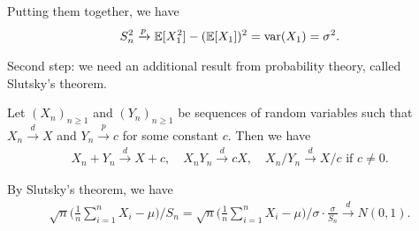 \documentclass[11pt,letterpaper]{article}
\begin{document}
Putting them together, we have
\begin{align*}
  S_n^2 \xrightarrow{p} {\mathbb{E}}[X_1^2] - ({\mathbb{E}}[X_1])^2 = \operatorname{var}(X_1) = \sigma^2.
\end{align*}

Second step: we need an additional result from probability theory, called Slutsky's theorem.
\begin{theorem}
  Let $(X_n)_{n \geq 1}$ and $(Y_n)_{n \geq 1}$ be sequences of random variables such that $X_n \xrightarrow{d} X$ and $Y_n \xrightarrow{p} c$ for some constant $c$. Then we have
  \begin{align*}
    X_n + Y_n \xrightarrow{d} X + c, \quad X_n Y_n \xrightarrow{d} cX, \quad X_n / Y_n \xrightarrow{d} X / c \text{ if } c \neq 0.
  \end{align*}
\end{theorem}

By Slutsky's theorem, we have
\begin{align*}
  \sqrt{n}\Big(\frac{1}{n} \sum_{i=1}^n X_i -  \mu\Big) / S_n = \sqrt{n}\Big(\frac{1}{n} \sum_{i=1}^n X_i -  \mu\Big) / \sigma \cdot \frac{\sigma}{S_n} \xrightarrow{d} N(0,1).
\end{align*}
\end{document}

